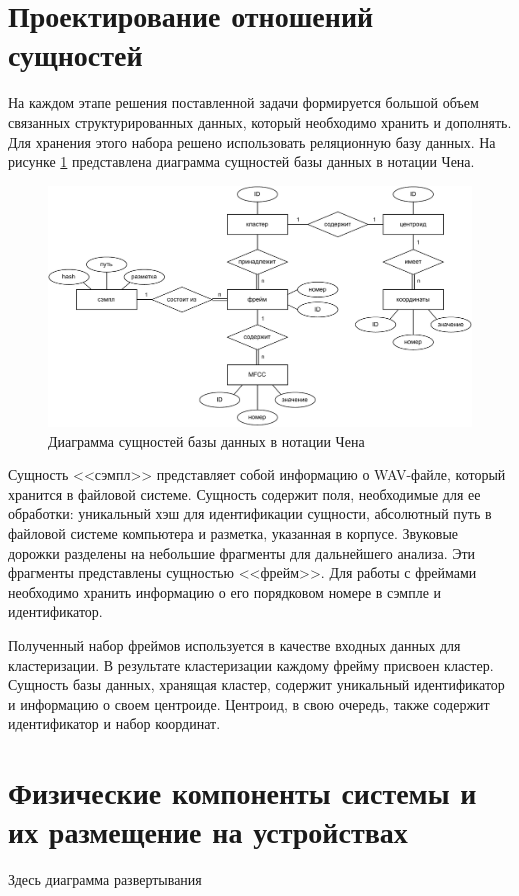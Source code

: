 \section{Проектирование отношений сущностей}
На каждом этапе  решения поставленной задачи формируется большой объем связанных структурированных данных, который необходимо хранить и дополнять. Для хранения этого набора решено использовать реляционную базу данных. На рисунке \ref{fig:chen} представлена диаграмма сущностей базы данных в нотации Чена.
\begin{figure}[H]
	\centering
	\includegraphics[width=\linewidth]{assets/chen}
	\caption{Диаграмма сущностей базы данных в нотации Чена}
	\label{fig:chen}
\end{figure} 
Сущность <<сэмпл>> представляет собой информацию о WAV-файле, который хранится в файловой системе. Сущность содержит поля, необходимые для ее обработки: уникальный хэш для идентификации сущности, абсолютный путь в файловой системе компьютера и разметка, указанная в корпусе. Звуковые дорожки разделены на небольшие фрагменты для дальнейшего анализа. Эти фрагменты представлены сущностью <<фрейм>>. Для работы с фреймами необходимо хранить информацию о его порядковом номере в сэмпле и идентификатор. 

Полученный набор фреймов используется в качестве входных данных для кластеризации. В результате кластеризации каждому фрейму присвоен кластер. Сущность базы данных, хранящая кластер, содержит уникальный идентификатор и информацию о своем центроиде. Центроид, в свою очередь, также содержит идентификатор и набор координат.
\section{Физические компоненты системы и их размещение на устройствах}
Здесь диаграмма развертывания
